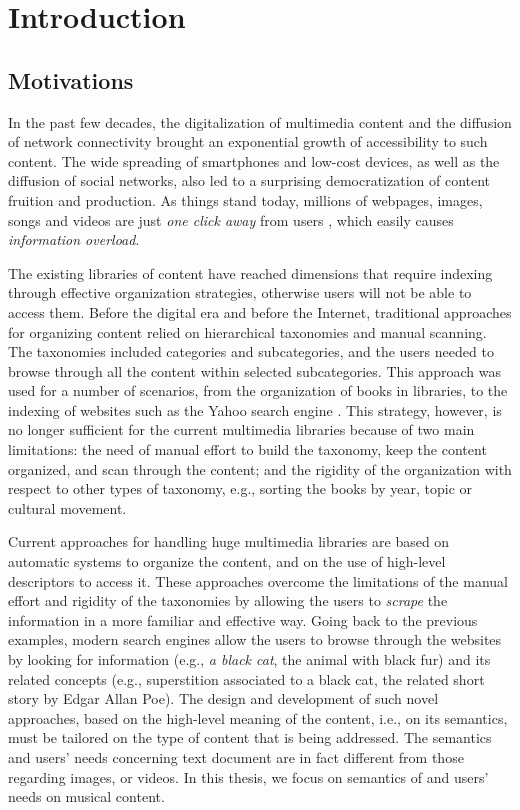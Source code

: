 \chapter{Introduction}
\section{Motivations}
In the past few decades, the digitalization of multimedia content and the diffusion of network connectivity brought an exponential growth of accessibility to such content. The wide spreading of smartphones and low-cost devices, as well as the diffusion of social networks, also led to a surprising democratization of content fruition and production. 
As things stand today, millions of webpages, images, songs and videos are just \textit{one click away} from users \cite{Buccoli2013}, which easily causes \textit{information overload}. 

The existing libraries of content have reached dimensions that require indexing through effective organization strategies, otherwise users will not be able to access them. Before the digital era and before the Internet, traditional approaches for organizing content relied on hierarchical taxonomies and manual scanning. The taxonomies included categories and subcategories, and the users needed to browse through all the content within selected subcategories. This approach was used for a number of scenarios, from the organization of books in libraries, to the indexing of websites such as the Yahoo search engine \cite{taubes1995rohtua}. This strategy, however, is no longer sufficient for the current multimedia libraries because of two main limitations: the need of manual effort to build the taxonomy, keep the content organized, and scan through the content; and the rigidity of the organization with respect to other types of taxonomy, e.g., sorting the books by year, topic or cultural movement. 

Current approaches for handling huge multimedia libraries are based on automatic systems to organize the content, and on the use of high-level descriptors to access it. These approaches overcome the limitations of the manual effort and rigidity of the taxonomies by allowing the users to \textit{scrape} the information in a more familiar and effective way. Going back to the previous examples, modern search engines allow the users to browse through the websites by looking for information (e.g., \textit{a black cat}, the animal with black fur) and its related concepts (e.g., superstition associated to a black cat, the related short story by Edgar Allan Poe). The design and development of such novel approaches, based on the high-level meaning of the content, i.e., on its semantics,  must be tailored on the type of content that is being addressed. The semantics and users' needs concerning text document are in fact different from those regarding images, or videos. In this thesis, we focus on semantics of and users' needs on musical content.

